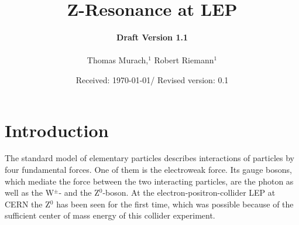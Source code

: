 \documentclass[epj,nopacs]{svjour}
\begin{document}
\hugehead

\newcommand{\dd}[1]{\mathrm{d}#1\,} %
\newcommand{\lref}[1]{listing~(\ref{lst:#1})} %
\newcommand{\fref}[1]{fig.~(\ref{fig:#1})} %
\newcommand{\tref}[1]{tab.~(\ref{tab:#1})} %
\newcommand{\eref}[1]{eq.~(\ref{eqn:#1})} %

\title{Z-Resonance at LEP}
\author{{\bf Draft Version 1.1}\\
\medskip \\
Thomas Murach,$^{1}$
Robert Riemann$^{1}$
} 
\date{Received: \today / Revised version: 0.1}

\maketitle

\vspace*{-1.5cm}
\section{ Introduction}
\baselineskip=0.38cm
\vspace*{1.cm}

The standard model of elementary particles describes interactions of particles
by four fundamental forces. One of them is the electroweak force. Its gauge
bosons, which mediate the force between the two interacting particles, are the
photon as well as the W$^{\pm}$- and the Z$^0$-boson. At the
electron-positron-collider LEP at CERN the Z$^0$ has been seen for the first
time, which was possible because of the sufficient center of mass energy of this
collider experiment.
\end{document}
